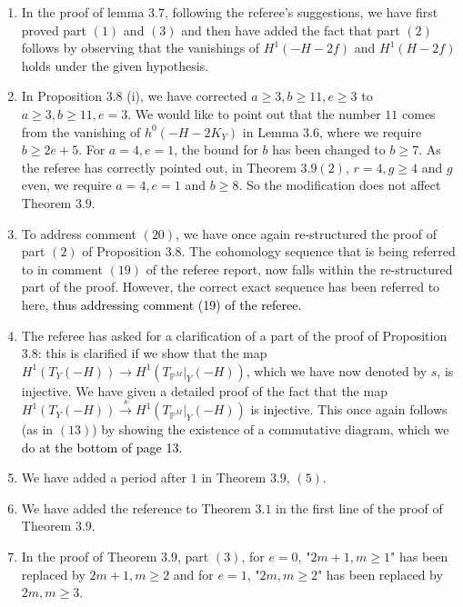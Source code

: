 \documentclass[11pt,twoside]{amsart}
\theoremstyle{plain}
\numberwithin{equation}{section}
\theoremstyle{definition}
\begin{document}
\begin{enumerate}
\item[$(17)$] In the proof of lemma $3.7$, following the referee's suggestions, we have first proved part $(1)$ and $(3)$ and then have added the fact that part $(2)$ follows by observing that the vanishings of $H^1(-H-2f)$ and $H^1(H-2f)$ holds under the given hypothesis.   

\item[$(18)$] In Proposition $3.8$ (i), we have corrected $a \geq 3, b \geq 11, e \geq 3$ to $a \geq 3, b \geq 11, e = 3$. We would like to point out that the number $11$ comes from the vanishing of $h^0(-H-2K_Y)$ in Lemma $3.6$, where we require $b \geq 2e+5$. For $a = 4, e = 1$, the bound for $b$ has been changed to $b \geq 7$. As the referee has correctly pointed out, in Theorem $3.9(2)$, $r = 4, g \geq 4$ and $g$ even, we require $a = 4, e = 1$ and $b \geq 8$. So the modification does not affect Theorem $3.9$.

\item[$(19)$] To address comment $(20)$, we have once again re-structured the proof of part $(2)$ of Proposition $3.8$.  The cohomology sequence that is being referred to in comment $(19)$ of the referee report, now falls within the re-structured part of the proof. However, the correct exact sequence has been referred to here, \textcolor{black}{thus addressing comment (19) of the referee.}
 
 
\item[$(20)$] The referee has asked for a clarification of a part of the proof of Proposition $3.8$: this is clarified if we show that the map $H^1(T_Y(-H)) \xrightarrow{}  H^1(T_{\mathbb{P}^M}|_Y(-H))$, which we have now denoted by $s$, is injective. We have given a detailed proof of the fact that the map $H^1(T_Y(-H)) \xrightarrow{s}  H^1(T_{\mathbb{P}^M}|_Y(-H))$ is injective. This once again follows (as in $(13)$) by showing the existence of a commutative diagram, which we do \textcolor{black}{at the bottom of page 13.} 


\item[$(21)$] We have added a period after $1$ in Theorem $3.9$, $(5)$.

\item[$(22)$] We have added the reference to Theorem $3.1$ in the first line of the proof of Theorem $3.9$. 

\item[$(23)$] In the proof of Theorem $3.9$, part $(3)$, for $e = 0$, "$2m+1, m \geq 1$" has been replaced by $2m+1, m \geq 2$ and for $e = 1$, "$2m, m \geq 2$" has been replaced by $2m, m \geq 3$.


\end{enumerate}
\end{document}

